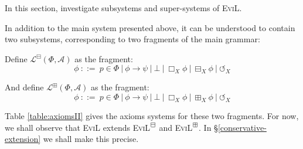 In this section, investigate subsystems and super-systems of
\textsc{EviL}.

In addition to the main system presented above, it can be understood to contain two subsystems, corresponding to two fragments of the main grammar:
\begin{definition}
Define $\mathcal{L}^\boxminus (\Phi, \mathcal{A})$ as the fragment:
\[ \phi \ {::=} \  p \in \Phi \  | \  \phi
   \rightarrow \psi \  | \  \bot \  |
   \  \Box_X \phi \  | \  \boxminus_X \phi
 \  | \ 
   \circlearrowleft_X \]

And define $\mathcal{L}^\boxplus (\Phi, \mathcal{A})$ as the fragment:
\[ \phi \ {::=} \  p \in \Phi \  | \  \phi
   \rightarrow \psi \  | \  \bot \  |
   \  \Box_X \phi 
   \  | \  \boxplus_X \phi
 \  | \ 
   \circlearrowleft_X \]
\end{definition}

Table \ref{table:axiomsII} gives the axioms systems for these two fragments.  For now, we shall observe that \textsc{EviL} extends \textsc{EviL}$^\boxminus$ and \textsc{EviL}$^\boxplus$.  In \S\ref{conservative-extension} we shall make this precise. 



